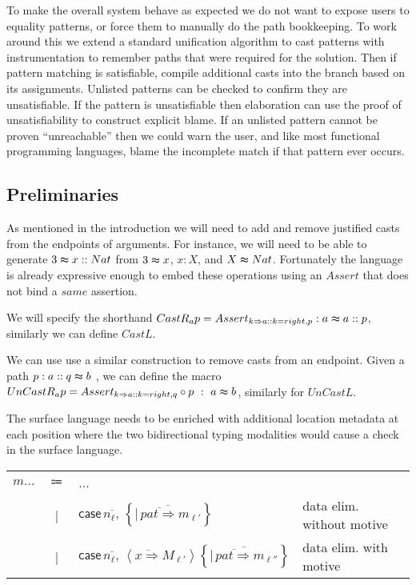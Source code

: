 To make the overall system behave as expected we do not want to expose
users to equality patterns, or force them to manually do the path
bookkeeping. To work around this we extend a standard unification
algorithm to cast patterns with instrumentation to remember paths
that were required for the solution. Then if pattern matching is satisfiable,
compile additional casts into the branch based on its assignments.
Unlisted patterns can be checked to confirm they are unsatisfiable.
If the pattern is unsatisfiable then elaboration can use the proof
of unsatisfiability to construct explicit blame. If an unlisted pattern
cannot be proven ``unreachable'' then we could warn the user, and
like most functional programming languages, blame the incomplete match
if that pattern ever occurs.

\subsection{Preliminaries}

As mentioned in the introduction we will need to add and remove justified
casts from the endpoints of arguments. For instance, we will need
to be able to generate $3\thickapprox x::Nat$ from $3\thickapprox x$,
$x:X$, and $X\thickapprox Nat$. Fortunately the language is already
expressive enough to embed these operations using an $Assert$ that
does not bind a $same$ assertion. 

We will specify the shorthand $CastR_{a}p=Assert_{k\Rightarrow a::k=right,p}:a\thickapprox a::p$,
similarly we can define $CastL$.

We can use use a similar construction to remove casts from an endpoint.
Given a path $p:a::q\thickapprox b$ , we can define the macro $UnCastR_{a}p=Assert_{k\Rightarrow a::k=right,q}\circ p\ :\ a\thickapprox b$,
similarly for $UnCastL$.

The surface language needs to be enriched with additional location
metadata at each position where the two bidirectional typing modalities
would cause a check in the surface language.

\begin{tabular}{lcll}
$m...$ & $\Coloneqq$ & ... & \tabularnewline
 & | & $\mathsf{case}\,\overline{n_{\ell},}\,\left\{ \overline{|\,\overline{pat\Rightarrow}m_{\ell'}}\right\} $ & data elim. without motive\tabularnewline
 & | & $\mathsf{case}\,\overline{n_{\ell},}\,\left\langle \overline{x\Rightarrow}M_{\ell'}\right\rangle \left\{ \overline{|\,\overline{pat\Rightarrow}m_{\ell''}}\right\} $ & data elim. with motive\tabularnewline
\end{tabular}

